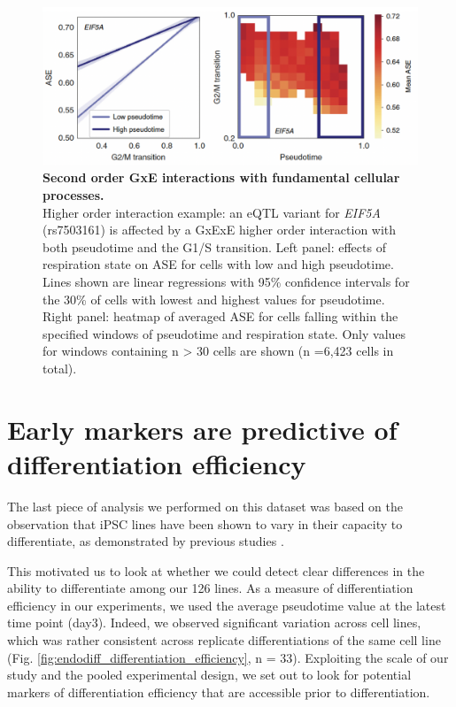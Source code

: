 \begin{figure}[h]
\centering
\includegraphics[width=15.5cm]{Chapter4/Fig/endodiff_GxExE.png}
\caption[Second order GxE interactions with fundamental cellular processes]{\textbf{Second order GxE interactions with fundamental cellular processes.}\\
Higher order interaction example: an eQTL variant for \textit{EIF5A} (rs7503161) is affected by a GxExE higher order interaction with both pseudotime and the G1/S transition. 
Left panel: effects of respiration state on ASE for cells with low and high pseudotime. 
Lines shown are linear regressions with 95\% confidence intervals for the 30\% of cells with lowest and highest values for pseudotime. 
Right panel: heatmap of averaged ASE for cells falling within the specified windows of pseudotime and respiration state. 
Only values for windows containing n > 30 cells are shown (n =6,423 cells in total).}
\label{fig:endodiff_gxexe}
\end{figure}

\newpage

\section{Early markers are predictive of differentiation efficiency}
\label{sec:endodiff_differentiation_efficiency}

The last piece of analysis we performed on this dataset was based on the observation that iPSC lines have been shown to vary in their capacity to differentiate, as demonstrated by previous studies \cite{bock2011reference}.

This motivated us to look at whether we could detect clear differences in the ability to differentiate among our 126 lines.
As a measure of differentiation efficiency in our experiments, we used the average pseudotime value at the latest time point (day3).
Indeed, we observed significant variation across cell lines, which was rather consistent across replicate differentiations of the same cell line (Fig. \ref{fig:endodiff_differentiation_efficiency}, n = 33).
Exploiting the scale of our study and the pooled experimental design, we set out to look for potential markers of differentiation efficiency that are accessible prior to differentiation.

